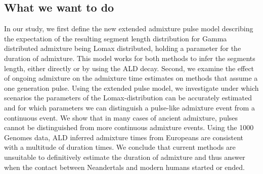 \documentclass[]{article}
\begin{document}
\subsection{What we want to do}\label{what-we-want-to-do}

In our study, we first define the new extended admixture pulse model describing the expectation of the resulting segment length distribution for Gamma distributed admixture being Lomax distributed, holding a parameter for the duration of admixture. This model works for
both methods to infer the segments length, either directly or by using
the ALD decay. Second, we examine the effect of ongoing admixture on the admixture time estimates on methods that assume a one generation pulse. Using the extended pulse model, we investigate under which scenarios the parameters of the Lomax-distribution can be accurately estimated and for which parameters we can distinguish a pulse-like admixture event from a continuous event. We show that in many cases of ancient admixture, pulses cannot be distinguished from more continuous admixture events. Using the 1000 Genomes data, ALD inferred admixture times from Europeans are consistent with a multitude of duration times.
We conclude that current methods are unsuitable to definitively estimate the duration of admixture and thus answer when the contact between Neandertals and modern humans started or ended.
\end{document}
